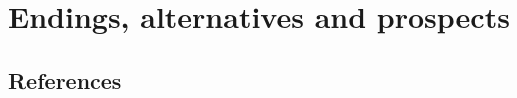 \part{Endings, alternatives and prospects}

 






\chapter{References}
\printbibliography[heading=none]
\afterpage{\blankpage}

%




